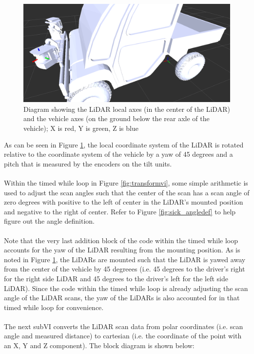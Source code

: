 \begin{figure}[h!]
\centering
\includegraphics[scale=0.3]{Photos/lidarrobotaxes.png}
\caption{Diagram showing the LiDAR local axes (in the center of the LiDAR) and the vehicle axes (on the ground below the rear axle of the vehicle); X is red, Y is green, Z is blue}
\label{fig:lidarrobotaxes}
\end{figure}

\noindent As can be seen in Figure \ref{fig:lidarrobotaxes}, the local coordinate system of the LiDAR is rotated relative to the coordinate system of the vehicle by a yaw of 45 degrees and a pitch that is measured by the encoders on the tilt units. \\ \\
%
\noindent Within the timed while loop in Figure \ref{fig:transformvi}, some simple arithmetic is used to adjust the scan angles such that the center of the scan has a scan angle of zero degrees with positive to the left of center in the LiDAR's mounted position and negative to the right of center. Refer to Figure \ref{fig:sick_angledef} to help figure out the angle definition.\\ \\
%
Note that the very last addition block of the code within the timed while loop accounts for the yaw of the LiDAR resulting from the mounting position. As is noted in Figure \ref{fig:lidarrobotaxes}, the LiDARs are mounted such that the LiDAR is yawed away from the center of the vehicle by 45 degreees (i.e. 45 degrees to the driver's right for the right side LiDAR and 45 degrees to the driver's left for the left side LiDAR). Since the code within the timed while loop is already adjusting the scan angle of the LiDAR scans, the yaw of the LiDARs is also accounted for in that timed while loop for convenience.\\ \\
%
The next subVI converts the LiDAR scan data from polar coordinates (i.e. scan angle and measured distance) to cartesian (i.e. the coordinate of the point with an X, Y and Z component). The block diagram is shown below:

